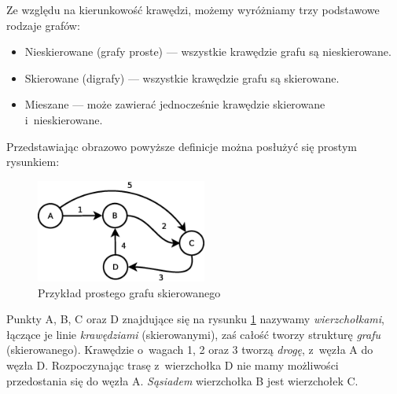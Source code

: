 \documentclass[a4paper,12pt,polish,twoside,openright]{thesis}
\begin{document}
Ze względu na kierunkowość krawędzi, możemy wyróżniamy trzy podstawowe rodzaje grafów:
\begin{itemize}
	\item Nieskierowane (grafy proste) --- wszystkie krawędzie grafu są nieskierowane.
	\item Skierowane (digrafy) --- wszystkie krawędzie grafu są skierowane.
	\item Mieszane --- może zawierać jednocześnie krawędzie skierowane i~nieskierowane.
\end{itemize}

Przedstawiając obrazowo powyższe definicje można posłużyć się prostym rysunkiem:
\begin{figure}[htb]
	\begin{center}
		\includegraphics[width=0.5\textwidth]{gfx/small_graph.eps}
		\caption{Przykład prostego grafu skierowanego}
		\label{fig:smallgraph}
	\end{center}
\end{figure}

Punkty A, B, C oraz D znajdujące się na rysunku \ref{fig:smallgraph} nazywamy \emph{wierzchołkami}, łączące je linie \emph{krawędziami} (skierowanymi), zaś całość tworzy strukturę \emph{grafu} (skierowanego).
Krawędzie o~wagach 1, 2 oraz 3 tworzą \emph{drogę}, z~węzła A do węzła D. Rozpoczynając trasę z~wierzchołka D nie mamy możliwości przedostania się do węzła A.
\emph{Sąsiadem} wierzchołka B jest wierzchołek C.
\end{document}
